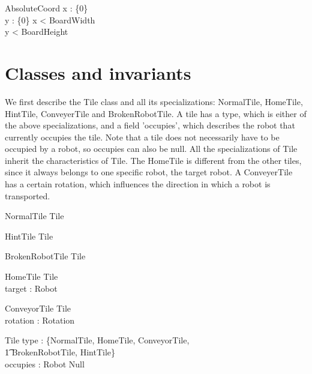 \documentclass[12pt]{article}
\begin{document}
\begin{schema}{AbsoluteCoord}
x : \nat \cup \{0\} \\
y : \nat \cup \{0\}
\where
x < BoardWidth \\
y < BoardHeight
\end{schema}


\section{Classes and invariants}
We first describe the Tile class and all its specializations: NormalTile, HomeTile, HintTile, ConveyerTile and BrokenRobotTile. A tile has a type, which is either of the above specializations, and a field 'occupies', which describes the robot that currently occupies the tile. Note that a tile does not necessarily have to be occupied by a robot, so occupies can also be null. All the specializations of Tile inherit the characteristics of Tile. The HomeTile is different from the other tiles, since it always belongs to one specific robot, the target robot. A ConveyerTile has a certain rotation, which influences the direction in which a robot is transported. 

\begin{schema}{NormalTile}
Tile
\end{schema}

\begin{schema}{HintTile}
Tile
\end{schema}

\begin{schema}{BrokenRobotTile}
Tile
\end{schema}

\begin{schema}{HomeTile}
Tile \\
target : Robot
\end{schema}

\begin{schema}{ConveyorTile}
Tile \\
rotation : Rotation
\end{schema}

\begin{schema}{Tile}
type : \{NormalTile, HomeTile, ConveyorTile, \\ \t1 BrokenRobotTile, HintTile\} \\
occupies : Robot \cup Null
\end{schema}
\end{document}
